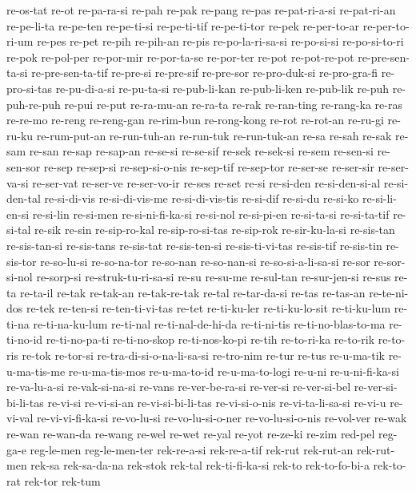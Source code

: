{re-os-tat re-ot re-pa-ra-si re-pah re-pak re-pang re-pas re-pat-ri-a-si
re-pat-ri-an re-pe-li-ta re-pe-ten re-pe-ti-si re-pe-ti-tif re-pe-ti-tor
re-pek re-per-to-ar re-per-to-ri-um re-pes re-pet re-pih re-pih-an re-pis
re-po-la-ri-sa-si re-po-si-si re-po-si-to-ri re-pok re-pol-per re-por-mir
re-por-ta-se re-por-ter re-pot re-pot-re-pot re-pre-sen-ta-si
re-pre-sen-ta-tif re-pre-si re-pre-sif re-pre-sor re-pro-duk-si
re-pro-gra-fi re-pro-si-tas re-pu-di-a-si re-pu-ta-si re-pub-li-kan
re-pub-li-ken re-pub-lik re-puh re-puh-re-puh re-pui re-put re-ra-mu-an
re-ra-ta re-rak re-ran-ting re-rang-ka re-ras re-re-mo re-reng re-reng-gan
re-rim-bun re-rong-kong re-rot re-rot-an re-ru-gi re-ru-ku re-rum-put-an
re-run-tuh-an re-run-tuk re-run-tuk-an re-sa re-sah re-sak re-sam re-san
re-sap re-sap-an re-se-si re-se-sif re-sek re-sek-si re-sem re-sen-si
re-sen-sor re-sep re-sep-si re-sep-si-o-nis re-sep-tif re-sep-tor
re-ser-se re-ser-sir re-ser-va-si re-ser-vat re-ser-ve re-ser-vo-ir re-ses
re-set re-si re-si-den re-si-den-si-al re-si-den-tal re-si-di-vis
re-si-di-vis-me re-si-di-vis-tis re-si-dif re-si-du re-si-ko
re-si-li-en-si re-si-lin re-si-men re-si-ni-fi-ka-si re-si-nol re-si-pi-en
re-si-ta-si re-si-ta-tif re-si-tal re-sik re-sin re-sip-ro-kal
re-sip-ro-si-tas re-sip-rok re-sir-ku-la-si re-sis-tan re-sis-tan-si
re-sis-tans re-sis-tat re-sis-ten-si re-sis-ti-vi-tas re-sis-tif
re-sis-tin re-sis-tor re-so-lu-si re-so-na-tor re-so-nan re-so-nan-si
re-so-si-a-li-sa-si re-sor re-sor-si-nol re-sorp-si re-struk-tu-ri-sa-si
re-su re-su-me re-sul-tan re-sur-jen-si re-sus re-ta re-ta-il re-tak
re-tak-an re-tak-re-tak re-tal re-tar-da-si re-tas re-tas-an re-te-ni-dos
re-tek re-ten-si re-ten-ti-vi-tas re-tet re-ti-ku-ler re-ti-ku-lo-sit
re-ti-ku-lum re-ti-na re-ti-na-ku-lum re-ti-nal re-ti-nal-de-hi-da
re-ti-ni-tis re-ti-no-blas-to-ma re-ti-no-id re-ti-no-pa-ti re-ti-no-skop
re-ti-nos-ko-pi re-tih re-to-ri-ka re-to-rik re-to-ris re-tok re-tor-si
re-tra-di-si-o-na-li-sa-si re-tro-nim re-tur re-tus re-u-ma-tik
re-u-ma-tis-me re-u-ma-tis-mos re-u-ma-to-id re-u-ma-to-logi re-u-ni
re-u-ni-fi-ka-si re-va-lu-a-si re-vak-si-na-si re-vans re-ver-be-ra-si
re-ver-si re-ver-si-bel re-ver-si-bi-li-tas re-vi-si re-vi-si-an
re-vi-si-bi-li-tas re-vi-si-o-nis re-vi-ta-li-sa-si re-vi-u re-vi-val
re-vi-vi-fi-ka-si re-vo-lu-si re-vo-lu-si-o-ner re-vo-lu-si-o-nis
re-vol-ver re-wak re-wan re-wan-da re-wang re-wel re-wet re-yal re-yot
re-ze-ki re-zim red-pel reg-ga-e reg-le-men reg-le-men-ter rek-re-a-si
rek-re-a-tif rek-rut rek-rut-an rek-rut-men rek-sa rek-sa-da-na rek-stok
rek-tal rek-ti-fi-ka-si rek-to rek-to-fo-bi-a rek-to-rat rek-tor rek-tum
}
